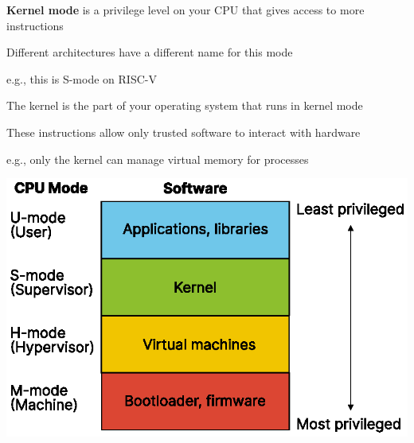 \begin{slide}
  

  \textbf{Kernel mode} is a privilege level on your CPU that gives access
  to more instructions
  \bigskip

  Different architectures have a different name for this mode

  \leftspace{}e.g., this is S-mode on RISC-V

  \bigskip
  \pause

  The kernel is the part of your operating system that runs in kernel mode
  \medskip

  These instructions allow only trusted software to interact with hardware

  \leftspace{}e.g., only the kernel can manage virtual memory for processes
\end{slide}

\begin{slide}
  

  \includegraphics{cpu-modes.eps}

\end{slide}

